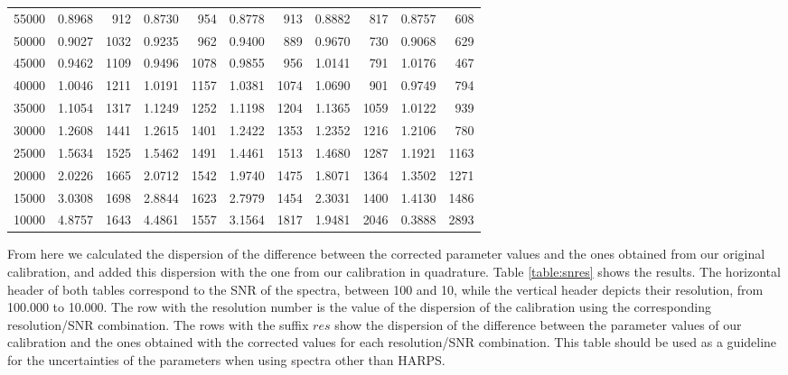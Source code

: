 \documentclass{aa}
\begin{document}
\begin{table}[h]
\begin{center}
{{\begin{tabular}{l r r r r r r r r r r}
55000 & 0.8968 & 912 & 0.8730 & 954 & 0.8778 & 913 & 0.8882 & 817 & 0.8757 & 608 \\
50000 & 0.9027 & 1032 & 0.9235 & 962 & 0.9400 & 889 & 0.9670 & 730 & 0.9068 & 629 \\
45000 & 0.9462 & 1109 & 0.9496 & 1078 & 0.9855 & 956 & 1.0141 & 791 & 1.0176 & 467 \\
40000 & 1.0046 & 1211 & 1.0191 & 1157 & 1.0381 & 1074 & 1.0690 & 901 & 0.9749 & 794 \\
35000 & 1.1054 & 1317 & 1.1249 & 1252 & 1.1198 & 1204 & 1.1365 & 1059 & 1.0122 & 939 \\
30000 & 1.2608 & 1441 & 1.2615 & 1401 & 1.2422 & 1353 & 1.2352 & 1216 & 1.2106 & 780 \\
25000 & 1.5634 & 1525 & 1.5462 & 1491 & 1.4461 & 1513 & 1.4680 & 1287 & 1.1921 & 1163 \\
20000 & 2.0226 & 1665 & 2.0712 & 1542 & 1.9740 & 1475 & 1.8071 & 1364 & 1.3502 & 1271 \\
15000 & 3.0308 & 1698 & 2.8844 & 1623 & 2.7979 & 1454 & 2.3031 & 1400 & 1.4130 & 1486 \\
10000 & 4.8757 & 1643 & 4.4861 & 1557 & 3.1564 & 1817 & 1.9481 & 2046 & 0.3888 & 2893 \\
\hline
\end{tabular}
}}
\end{center}
\end{table}

From here we calculated the dispersion of the difference between the corrected parameter values and the ones obtained from our original calibration, and added this dispersion with the one from our calibration in quadrature. Table \ref{table:snres} shows the results. The horizontal header of both tables correspond to the SNR of the spectra, between 100 and 10,  while the vertical header depicts their resolution, from 100.000 to 10.000. The row with the resolution number is the value of the dispersion of the calibration using the corresponding resolution/SNR combination. The rows with the suffix $res$ show the dispersion of the difference between the parameter values of our calibration and the ones obtained with the corrected values for each resolution/SNR combination. This table should be used as a guideline for the uncertainties of the parameters when using spectra other than HARPS.
\end{document}
